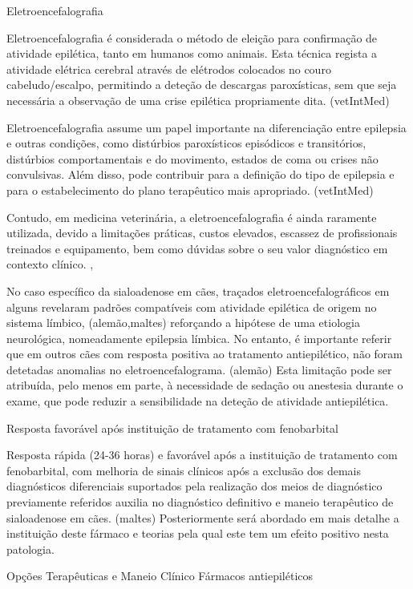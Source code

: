 Eletroencefalografia


Eletroencefalografia é considerada o método de eleição para confirmação de atividade epilética, tanto em humanos como animais. \cite{Everest2024} Esta técnica regista a atividade elétrica cerebral através de elétrodos colocados no couro cabeludo/escalpo, \cite{Everest2024} permitindo a deteção de descargas paroxísticas, sem que seja necessária a observação de uma crise epilética propriamente dita. (vetIntMed)


Eletroencefalografia assume um papel importante na diferenciação entre epilepsia e outras condições, como distúrbios paroxísticos episódicos e transitórios, distúrbios comportamentais e do movimento, estados de coma ou crises não convulsivas. \cite{Luca2023} Além disso, pode contribuir para a definição do tipo de epilepsia e para o estabelecimento do plano terapêutico mais apropriado. (vetIntMed)


Contudo, em medicina veterinária, a eletroencefalografia é ainda raramente utilizada, devido a limitações práticas, custos elevados, escassez de profissionais treinados e equipamento, bem como dúvidas sobre o seu valor diagnóstico em contexto clínico. \cite{Everest2024},\cite{Luca2023}


No caso específico da sialoadenose em cães, traçados eletroencefalográficos em alguns revelaram padrões compatíveis com atividade epilética de origem no sistema límbico, (alemão,maltes) reforçando a hipótese de uma etiologia neurológica, nomeadamente epilepsia límbica. No entanto, é importante referir que em outros cães com resposta positiva ao tratamento antiepilético, não foram detetadas anomalias no eletroencefalograma. (alemão) Esta limitação pode ser atribuída, pelo menos em parte, à necessidade de sedação ou anestesia durante o exame, que pode reduzir a sensibilidade na deteção de atividade antiepilética. \cite{Animalmodel}

Resposta favorável após instituição de tratamento com fenobarbital

Resposta rápida (24-36 horas) e favorável após a instituição de tratamento com fenobarbital, com melhoria de sinais clínicos após a exclusão dos demais diagnósticos diferenciais suportados pela realização dos meios de diagnóstico previamente referidos auxilia no diagnóstico definitivo e maneio terapêutico de sialoadenose em cães. (maltes) Posteriormente será abordado em mais detalhe a instituição deste fármaco e teorias pela qual este tem um efeito positivo nesta patologia. 

Opções Terapêuticas e Maneio Clínico 
Fármacos antiepiléticos


